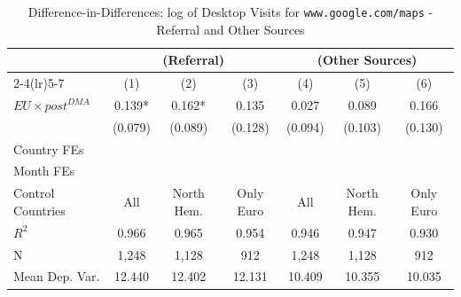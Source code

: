 \documentclass[11pt]{article}
\begin{document}
	
	
	
	
	
	\clearpage
	
	
	
	\begin{table}
		\centering
		\def\sym#1{\ifmmode^{#1}\else\(^{#1}\)\fi}
		\caption{\label{tab:did_referral_other} Difference-in-Differences: log of Desktop Visits for \texttt{www.google.com/maps} - Referral and Other Sources}
		\begin{threeparttable}
			\begin{tabular}{lcccccc}
				\hline \noalign{\smallskip} 
				& \multicolumn{3}{c}{(Referral)} & \multicolumn{3}{c}{(Other Sources)}  \\ \cmidrule(lr){2-4}\cmidrule(lr){5-7}
				
				&         (1)   &         (2)   &         (3)   &         (4)   &         (5)   &         (6)   \\
				\midrule
				$ EU \times post^{DMA} $ &       0.139*  &       0.162*  &       0.135   &       0.027   &       0.089   &       0.166   \\
				&     (0.079)   &     (0.089)   &     (0.128)   &     (0.094)   &     (0.103)   &     (0.130)   \\
				
				Country FEs         &  \checkmark   &  \checkmark   &  \checkmark   &  \checkmark   &  \checkmark   &  \checkmark   \\
				Month FEs           &  \checkmark   &  \checkmark   &  \checkmark   &  \checkmark   &  \checkmark   &  \checkmark   \\
				Control Countries   &         All   &  North Hem.   &   Only Euro   &         All   &  North Hem.   &   Only Euro   \\
				$ R ^2 $            &       0.966   &       0.965   &       0.954   &       0.946   &       0.947   &       0.930   \\
				N                   &       1,248   &       1,128   &         912   &       1,248   &       1,128   &         912   \\
				Mean Dep. Var.      &      12.440   &      12.402   &      12.131   &      10.409   &      10.355   &      10.035   \\
				\midrule
				
			\end{tabular}
			

\end{threeparttable}
\end{table}
\end{document}
